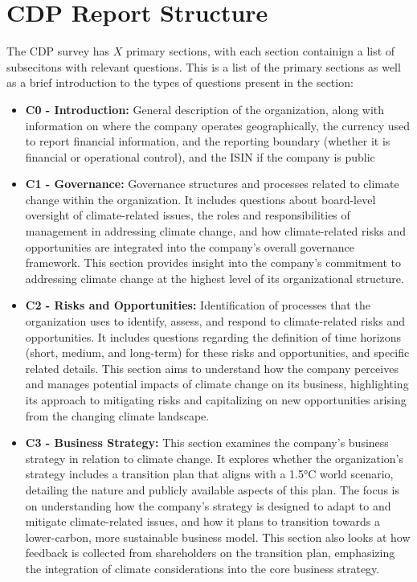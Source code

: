 \section{CDP Report Structure}
The CDP survey has $X$ primary sections, with each section containign a list of subsecitons with relevant questions. This is a list of the primary sections as well as a brief introduction to the types of questions present in the section:
\begin{itemize}
    \item \textbf{C0 - Introduction:} General description of the organization, along with information on where the company operates geographically, the currency used to report financial information, and the reporting boundary (whether it is financial or operational control), and the ISIN if the company is public
    \item \textbf{C1 - Governance:} Governance structures and processes related to climate change within the organization. It includes questions about board-level oversight of climate-related issues, the roles and responsibilities of management in addressing climate change, and how climate-related risks and opportunities are integrated into the company's overall governance framework. This section provides insight into the company's commitment to addressing climate change at the highest level of its organizational structure.
    \item \textbf{C2 - Risks and Opportunities:} Identification of processes that the organization uses to identify, assess, and respond to climate-related risks and opportunities. It includes questions regarding the definition of time horizons (short, medium, and long-term) for these risks and opportunities, and specific related details. This section aims to understand how the company perceives and manages potential impacts of climate change on its business, highlighting its approach to mitigating risks and capitalizing on new opportunities arising from the changing climate landscape.
    \item \textbf{C3 - Business Strategy:} This section examines the company's business strategy in relation to climate change. It explores whether the organization's strategy includes a transition plan that aligns with a 1.5°C world scenario, detailing the nature and publicly available aspects of this plan. The focus is on understanding how the company's strategy is designed to adapt to and mitigate climate-related issues, and how it plans to transition towards a lower-carbon, more sustainable business model. This section also looks at how feedback is collected from shareholders on the transition plan, emphasizing the integration of climate considerations into the core business strategy.

\end{itemize}
